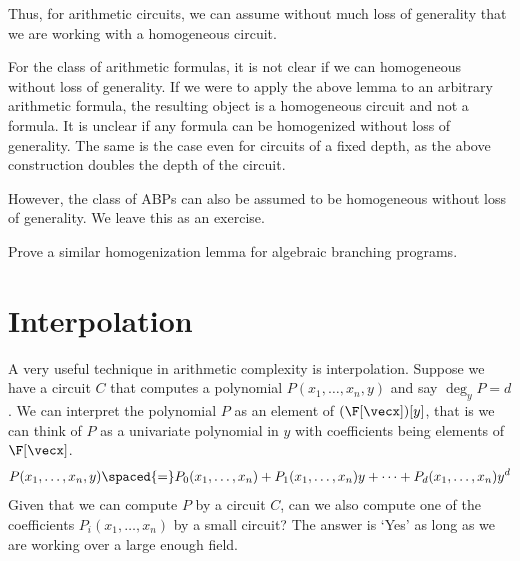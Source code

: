 Thus, for arithmetic circuits, we can assume without much loss of generality that we are working with a homogeneous circuit. 

\begin{remark*}
For the class of arithmetic formulas, it is not clear if we can homogeneous without loss of generality. 
If we were to apply the above lemma to an arbitrary arithmetic formula, the resulting object is a homogeneous circuit and not a formula. 
It is unclear if any formula can be homogenized without loss of generality. 
The same is the case even for circuits of a fixed depth, as the above construction doubles the depth of the circuit. 

However, the class of ABPs can also be assumed to be homogeneous without loss of generality. 
We leave this as an exercise. 
\end{remark*}

\begin{exercise}
Prove a similar homogenization lemma for algebraic branching programs. 
\end{exercise}

\section{Interpolation}

A very useful technique in arithmetic complexity is interpolation. Suppose we have a circuit $C$ that computes a polynomial $P(x_1,\ldots, x_n, y)$ and say $\deg_y P = d$. We can interpret the polynomial $P$ as an element of $(\F[\vecx])[y]$, that is we can think of $P$ as a univariate polynomial in $y$ with coefficients being elements of $\F[\vecx]$. 
\[
P(x_1,\ldots, x_n, y) \spaced{=} P_0(x_1,\ldots, x_n) + P_1(x_1,\ldots, x_n) y + \cdots + P_d(x_1,\ldots, x_n) y^d
\]
Given that we can compute $P$ by a circuit $C$, can we also compute one of the coefficients $P_i(x_1,\ldots, x_n)$ by a small circuit? The answer is `Yes' as long as we are working over a large enough field. 

